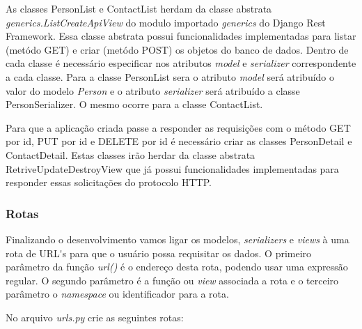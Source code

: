   As classes PersonList e ContactList herdam da classe abstrata \textit{generics.ListCreateApiView} do modulo
  importado \textit{generics} do Django Rest Framework. Essa classe abstrata possui funcionalidades implementadas para 
  listar (metódo GET) e criar (metódo POST) os objetos do banco de dados. Dentro de cada classe é necessário especificar
  nos atributos \textit{model} e \textit{serializer} correspondente a cada classe. Para a classe PersonList sera o atributo
  \textit{model} será atribuído o valor do modelo \textit{Person} e o atributo \textit{serializer} será atribuído a classe PersonSerializer. 
  O mesmo ocorre para a classe ContactList.
  
  Para que a aplicação criada passe a responder as requisições com o método GET por id, PUT por id e DELETE por id é necessário criar
  as classes PersonDetail e ContactDetail. Estas classes irão herdar da classe abstrata RetriveUpdateDestroyView que já possui 
  funcionalidades implementadas para responder essas solicitações do protocolo \ac{HTTP}.

\subsubsection{Rotas}

  Finalizando o desenvolvimento vamos ligar os modelos, \textit{serializers} e \textit{views} à uma rota de URL\'{}s para que o usuário
  possa requisitar os dados. O primeiro parâmetro da função \textit{url()} é o endereço desta rota, podendo
  usar uma expressão regular. O segundo parâmetro é a função ou \textit{view} associada a rota e o terceiro
  parâmetro o \textit{namespace} ou identificador para a rota.
  
  No arquivo \textit{urls.py} crie as seguintes rotas:
  
